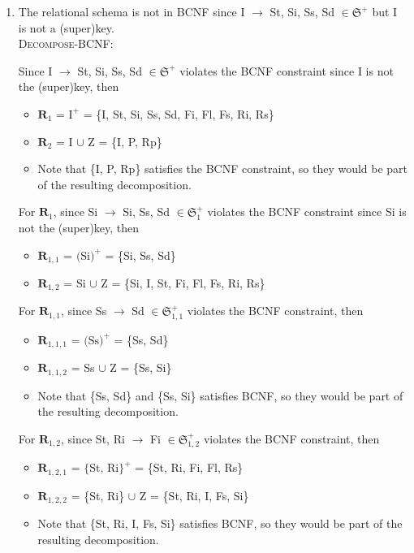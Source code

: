 \documentclass[12pt]{article}
\begin{document}
\begin{enumerate}
  \item The relational schema is not in BCNF since I $\longrightarrow$ St, Si,
        Ss, Sd $\in \mathfrak{S}^+$ but I is not a (super)key. \\

        \textsc{Decompose-BCNF}:

        Since I $\longrightarrow$ St, Si, Ss, Sd $\in \mathfrak{S}^+$ violates
        the BCNF constraint since I is not the (super)key, then
        \begin{itemize}
          \item $\textbf{R}_1$ = $\text{I}^+$ 
                               = \{I, St, Si, Ss, Sd, Fi, Fl, Fs, Ri, Rs\}
          \item $\textbf{R}_2$ = I $\cup$ Z
                               = \{I, P, Rp\}
          \item Note that \{I, P, Rp\} satisfies the BCNF constraint, so they
                would be part of the resulting decomposition.
        \end{itemize}

        For $\textbf{R}_1$, since Si $\longrightarrow$ Si, Ss, Sd $\in
        \mathfrak{S}_1^+$ violates the BCNF constraint since Si is not the
        (super)key, then
        \begin{itemize}
          \item $\textbf{R}_{1, 1}$ = $\text{(Si)}^+$
                                    = \{Si, Ss, Sd\}
          \item $\textbf{R}_{1, 2}$ = Si $\cup$ Z
                                    = \{Si, I, St, Fi, Fl, Fs, Ri, Rs\}
        \end{itemize}

        For $\textbf{R}_{1,1}$, since Ss $\longrightarrow$ Sd $\in
        \mathfrak{S}_{1,1}^+$ violates the BCNF constraint, then
        \begin{itemize}
          \item $\textbf{R}_{1,1,1}$ = $\text{(Ss)}^+$
                                     = \{Ss, Sd\}
          \item $\textbf{R}_{1,1,2}$ = Ss $\cup$ Z
                                     = \{Ss, Si\}
          \item Note that \{Ss, Sd\} and \{Ss, Si\} satisfies BCNF, so they
                would be part of the resulting decomposition.
        \end{itemize}

        For $\textbf{R}_{1,2}$, since St, Ri $\longrightarrow$ Fi $\in
        \mathfrak{S}_{1,2}^+$ violates the BCNF constraint, then
        \begin{itemize}
          \item $\textbf{R}_{1,2,1}$ = $\text{\{St, Ri\}}^+$
                                     = \{St, Ri, Fi, Fl, Rs\}
          \item $\textbf{R}_{1,2,2}$ = \{St, Ri\} $\cup$ Z
                                     = \{St, Ri, I, Fs, Si\}
          \item Note that \{St, Ri, I, Fs, Si\} satisfies BCNF, so they would be
                part of the resulting decomposition.
        \end{itemize}


\end{enumerate}
\end{document}
